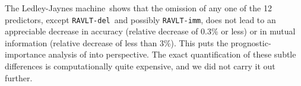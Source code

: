 \documentclass[utf8]{FrontiersinHarvard_mod} %
\renewcommand*{\|}[1][]{\nonscript\:#1\vert\nonscript\:\mathopen{}}
\newcommand*{\ravltimm}{\texttt{RAVLT-imm}}
\newcommand*{\ravltdel}{\texttt{RAVLT-del}}
\newcommand*{\ad}{Alzheimer's Disease}
\newcommand*{\ljm}{Ledley-Jaynes machine}
\begin{document}
The \ljm\ shows that the omission of any one of the 12 predictors, except \ravltdel\ and possibly \ravltimm, does not lead to an appreciable decrease in accuracy (relative decrease of 0.3\% or less) or in mutual information (relative decrease of less than 3\%). This puts the prognostic-importance analysis of \citet{ryeetal2022} into perspective. The exact quantification of these subtle differences is computationally quite expensive, and we did not carry it out further.


\end{document}
